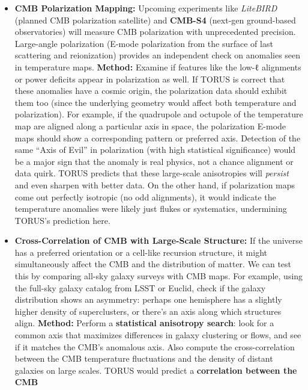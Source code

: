 \documentclass[]{article}
\begin{document}
\begin{itemize}
  \begin{itemize}
  \item
    \textbf{CMB Polarization Mapping:} Upcoming experiments like
    \emph{LiteBIRD} (planned CMB polarization satellite) and
    \textbf{CMB-S4} (next-gen ground-based observatories) will measure
    CMB polarization with unprecedented precision. Large-angle
    polarization (E-mode polarization from the surface of last
    scattering and reionization) provides an independent check on
    anomalies seen in temperature maps​. \textbf{Method:} Examine if
    features like the low-ℓ alignments or power deficits appear in
    polarization as well. If TORUS is correct that these anomalies have
    a cosmic origin, the polarization data should exhibit them too
    (since the underlying geometry would affect both temperature and
    polarization). For example, if the quadrupole and octupole of the
    temperature map are aligned along a particular axis in space, the
    polarization E-mode maps should show a corresponding pattern or
    preferred axis​. Detection of the same ``Axis of Evil'' in
    polarization (with high statistical significance) would be a major
    sign that the anomaly is real physics, not a chance alignment or
    data quirk​. TORUS predicts that these large-scale anisotropies will
    \emph{persist} and even sharpen with better data​. On the other
    hand, if polarization maps come out perfectly isotropic (no odd
    alignments), it would indicate the temperature anomalies were likely
    just flukes or systematics, undermining TORUS's prediction here​.
  \item
    \textbf{Cross-Correlation of CMB with Large-Scale Structure:} If the
    universe has a preferred orientation or a cell-like recursion
    structure, it might simultaneously affect the CMB and the
    distribution of matter. We can test this by comparing all-sky galaxy
    surveys with CMB maps​. For example, using the full-sky galaxy
    catalog from LSST or Euclid, check if the galaxy distribution shows
    an asymmetry: perhaps one hemisphere has a slightly higher density
    of superclusters, or there's an axis along which structures align.
    \textbf{Method:} Perform a \textbf{statistical anisotropy search}:
    look for a common axis that maximizes differences in galaxy
    clustering or flows, and see if it matches the CMB's anomalous axis.
    Also compute the cross-correlation between the CMB temperature
    fluctuations and the density of distant galaxies on large scales.
    TORUS would predict a \textbf{correlation between the CMB
}
\end{itemize}
\end{itemize}
\end{document}
